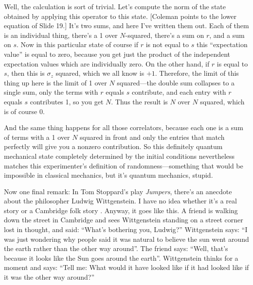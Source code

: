 \documentclass[12pt,nofootinbib]{revtex4}
\begin{document}
Well, the calculation is sort of trivial. Let's compute the norm of the state obtained by applying this operator to this state.  [Coleman points to the lower equation of Slide 19.]  It's two sums, and here I've written them out. Each of them is an individual thing, there's a 1 over $N$-squared, there's a sum on $r$, and a sum on $s$. Now in this particular state of course if $r$ is not equal to $s$ this ``expectation value'' is equal to zero, because you get just the product of the independent expectation values which are individually zero. On the other hand, if $r$ is equal to $s$, then this is $\sigma_z$ squared, which we all know is $+1$. Therefore, the limit of this thing up here is the limit of 1 over $N$ squared---the double sum collapses to a single sum, only the terms with $r$ equals $s$ contribute, and each entry with $r$ equals $s$ contributes 1, so you get $N$. Thus the result is $N$ over $N$ squared, which is of course 0.

And the same thing happens for all those correlators, because each one is a sum of terms with a 1 over $N$ squared in front and only the entries that match perfectly will give you a nonzero contribution. So this definitely quantum mechanical state completely determined by the initial conditions nevertheless matches this experimenter's definition of randomness---something that would be impossible in classical mechanics, but it's quantum mechanics, stupid.

Now one final remark:
In Tom Stoppard's play \emph{Jumpers}, there's an anecdote about the philosopher Ludwig Wittgenstein. I have no idea whether it's a real story or a Cambridge folk story \cite{stoppard}. Anyway, it goes like this.  A friend is walking down the street in Cambridge and sees Wittgenstein standing on a street corner lost in thought, and said: ``What's bothering you, Ludwig?'' Wittgenstein says: ``I was just wondering why people said it was natural to believe the sun went around the earth rather than the other way around''. The friend says: ``Well, that's because it looks like the Sun goes around the earth''. Wittgenstein thinks for a moment and says: ``Tell me: What would it have looked like if it had looked like if it was the other way around?''

\end{document}
